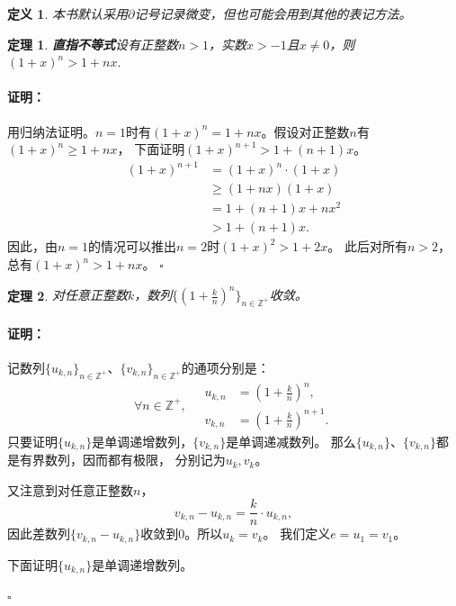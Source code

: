 \documentclass[12pt,UTF8]{ctexbook}
\renewenvironment{proof}{\paragraph{\textbf{证明：}}}{\hfill$\square$}
\newtheorem{df}{定义}[section]
\newtheorem{tm}{定理}[section]
\begin{document}
\begin{appendix}
\begin{df}
本书默认采用$\partial$记号记录微变，但也可能会用到其他的表记方法。
\end{df}

\begin{tm}{\textbf{直指不等式}}\label{tm:b-1-20}
    设有正整数$n > 1$，实数$x > -1$且$x \neq 0$，则$(1 + x)^n > 1 + nx.$
\end{tm}

\begin{proof}
    用归纳法证明。$n = 1$时有$(1 + x)^n = 1 + nx$。假设对正整数$n$有$(1 + x)^n \geqslant 1 + nx$，
    下面证明$(1 + x)^{n+1} > 1 + (n+1)x$。
    \begin{align*}
        (1 + x)^{n+1} &= (1 + x)^{n} \cdot (1 + x)  \\
        &\geqslant (1 + nx)(1 + x)  \\
        &= 1 + (n + 1)x + nx^2  \\
        &> 1 + (n + 1)x.
   \end{align*}
   因此，由$n=1$的情况可以推出$n=2$时$(1 + x)^{2} > 1 + 2x$。
   此后对所有$n>2$，总有$(1 + x)^{n} > 1 + nx$。
\end{proof}

\begin{tm}\label{tm:b-1-30}
    对任意正整数$k$，数列$\{\left(1 + \frac{k}{n}\right)^n\}_{n\in\mathbb{Z}^+}$收敛。
\end{tm}

\begin{proof}
    记数列$\{u_{k,n}\}_{n\in\mathbb{Z}^+}$、$\{v_{k,n}\}_{n\in\mathbb{Z}^+}$的通项分别是：
    $$
    \forall n \in\mathbb{Z}^+, \quad
    \begin{array}{cl}
        u_{k,n} &=  \left(1 + \frac{k}{n}\right)^n, \\
        v_{k,n} &= \left(1 + \frac{k}{n}\right)^{n+1}.
    \end{array}
    $$
    只要证明$\{u_{k,n}\}$是单调递增数列，$\{v_{k,n}\}$是单调递减数列。
    那么$\{u_{k,n}\}$、$\{v_{k,n}\}$都是有界数列，因而都有极限，
    分别记为$u_{k}, v_k$。

    又注意到对任意正整数$n$，
    $$v_{k,n} - u_{k,n} = \frac{k}{n} \cdot u_{k,n}, $$
    因此差数列$\{v_{k,n} - u_{k,n}\}$收敛到$0$。所以$u_k = v_k$。
    我们定义$e = u_1 = v_1$。

    下面证明$\{u_{k,n}\}$是单调递增数列。


\end{proof}
\end{appendix}
\end{document}
